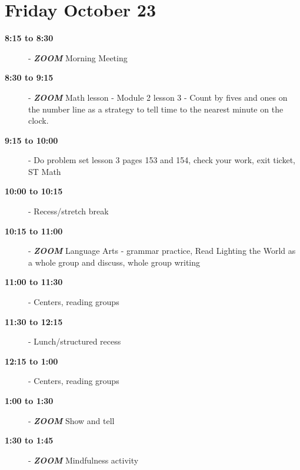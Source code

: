 \documentclass{article}
\newcommand{\timespan}[2]{\textbf{#1 to #2}}
\newcommand{\datepage}[1]{\newpage\section*{\centering\Huge{#1}}}
\newcommand{\zoom}{\textbf{\textit{ZOOM}\quad}}
\begin{document}
\datepage{Friday October 23}
\begin{description}
  \item[\timespan{8:15}{8:30}] - \zoom
    Morning Meeting
  \item[\timespan{8:30}{9:15}] - \zoom
    Math lesson - Module 2 lesson 3 - Count by fives and ones on the number
    line as a strategy to tell time to the nearest minute on the clock.
  \item[\timespan{9:15}{10:00}] -
    Do problem set lesson 3 pages 153 and 154, check your work, exit ticket, ST
    Math
  \item[\timespan{10:00}{10:15}] -
    Recess/stretch break
  \item[\timespan{10:15}{11:00}] - \zoom
    Language Arts - grammar practice, Read Lighting the World as a whole group
    and discuss, whole group writing
  \item[\timespan{11:00}{11:30}] -
    Centers, reading groups
  \item[\timespan{11:30}{12:15}] -
    Lunch/structured recess
  \item[\timespan{12:15}{1:00}] -
    Centers, reading groups
  \item[\timespan{1:00}{1:30}] - \zoom
    Show and tell
  \item[\timespan{1:30}{1:45}] - \zoom
    Mindfulness activity
\end{description}
\end{document}
